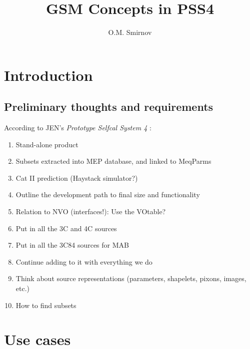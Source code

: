 \documentclass[10pt]{article}
\title{GSM Concepts in PSS4}
\author{O.M. Smirnov}
\begin{document}
\sloppy

\newcommand{\url}[1]{{\tt #1}}

\maketitle

\section{Introduction}

\subsection{Preliminary thoughts and requirements}

According to JEN's {\em Prototype Selfcal System 4} \cite{PSS4}:

\begin{enumerate}

\item Stand-alone product

\item Subsets extracted into MEP database, and linked to MeqParms

\item Cat II prediction (Haystack simulator?)

\item Outline the development path to final size and functionality

\item Relation to NVO (interfaces!): Use the VOtable?

\item Put in all the 3C and 4C sources

\item Put in all the 3C84 sources for MAB

\item Continue adding to it with everything we do

\item Think about source representations (parameters, shapelets, pixons, images, etc.)

\item How to find subsets

\end{enumerate}

\section{Use cases}
\end{document}

